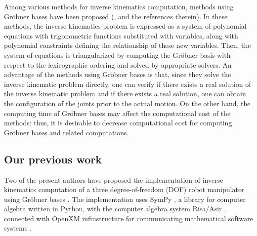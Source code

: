 \documentclass{birkjour}
\theoremstyle{plain}
\theoremstyle{definition}
\begin{document}
    Among various methods for inverse kinematics computation, methods using Gr\"obner bases 
    have been proposed 
    (\cite{fau-mer-rou2006,kal-kal1993,uch-mcp2011,uch-mcp2012},
    and the references therein). In these methods,
    the inverse kinematics problem is expressed as a system of polynomial equations with 
    trigonometric functions substituted with variables,
    along with polynomial constraints defining the relationship of these new variables.
    Then, the system of equations is 
    triangularized by computing the Gr\"obner basis with respect to the lexicographic ordering 
    and solved by appropriate solvers. 
    An advantage of the methods using Gr\"obner bases
    is that, since they solve the inverse kinematic problem directly, one can 
    verify if there exists a real solution of the inverse kinematic problem and if there  
    exists a real solution, one can obtain
    the configuration of the joints prior to the actual motion. 
    On the other hand, the computing time of Gr\"obner bases may affect the computational cost 
    of the methods: thus, it is desirable to decrease computational cost for computing 
    Gr\"obner bases and related computations.

    \subsection{Our previous work}

    Two of the present authors have proposed the implementation of inverse kinematics computation of a three degree-of-freedom (DOF) robot manipulator using Gr\"obner bases \cite{hor-ter-mik2020}. 
    The implementation uses SymPy \cite{sympy2017}, a library for computer algebra 
    written in Python, with the computer algebra system Risa/Asir
    \cite{nor2003,asir2018}, 
    connected with OpenXM infrastructure for communicating mathematical software systems 
    \cite{mae-nor-oha-tak-tam2001,openxm}. 
\end{document}

